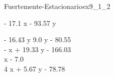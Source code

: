 
\begin{bilevelmodel}{Fuertemente-Estacionario}{ex9_1_2}
    \begin{upperlevel}{- 17.1 x - 93.57 y}{
        
    }
    \end{upperlevel}
    \begin{lowerlevel}{- 16.43 y}{
         9.0 y - 80.55  \\ 
 - x + 19.33 y - 166.03  \\ 
 x - 7.0  \\ 
 4 x + 5.67 y - 78.78 
    }
    \end{lowerlevel}
\end{bilevelmodel}
    
        